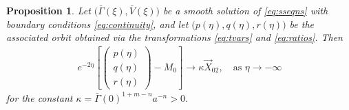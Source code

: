 \documentclass[a4paper,11pt]{article}
\def\bG{\bar{\Gamma}}
\def\bV{\bar{V}}
\newtheorem{proposition}{Proposition}[section]
\numberwithin{step}{dummy}
\begin{document}
\begin{proposition} \label{lem:alpha} Let $\big(\bG(\xi),\bV(\xi)\big)$ be a smooth solution of \eqref{eq:sseqns} 
with boundary conditions \eqref{eq:continuity}, and let $\big(p(\eta),q(\eta),r(\eta)\big)$ be the associated orbit obtained via the
transformations \eqref{eq:tvars} and \eqref{eq:ratios}. Then
\begin{align}
   e^{-2\eta}\left[\begin{pmatrix}
   p(\eta) \\ q(\eta) \\ r(\eta)
  \end{pmatrix}
  - M_0
  \right] \rightarrow \kappa\vec{X}_{02}, \quad \text{as $\eta \rightarrow -\infty$} \label{eq:estim}
\end{align} 
for the constant $\kappa = {\bar\Gamma(0)^{1+m-n}a^{-n}} >0$.
\end{proposition}
\end{document}
